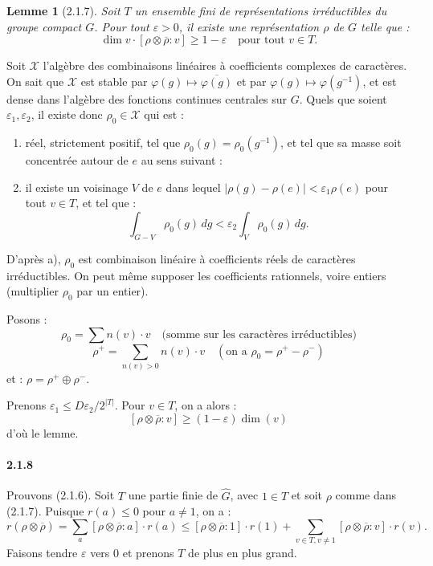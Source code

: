\documentclass[12pt,a4paper]{article}
\theoremstyle{plain}
\newtheorem{lemma}[theorem]{Lemme}
\theoremstyle{definition}
\theoremstyle{remark}
\begin{document}
\begin{lemma}[2.1.7]
Soit $T$ un ensemble fini de repr\'esentations irr\'eductibles du groupe compact $G$. Pour tout $\varepsilon > 0$, il existe une repr\'esentation $\rho$ de $G$ telle que :
\[ \dim v \cdot [\rho \otimes \overline{\rho} : v] \geq 1 - \varepsilon \quad \text{pour tout } v \in T. \]
\end{lemma}

Soit $\mathcal{X}$ l'alg\`ebre des combinaisons lin\'eaires \`a coefficients complexes de caract\`eres. On sait que $\mathcal{X}$ est stable par $\varphi(g) \mapsto \overline{\varphi(g)}$ et par $\varphi(g) \mapsto \varphi(g^{-1})$, et est dense dans l'alg\`ebre des fonctions continues centrales sur $G$. Quels que soient $\varepsilon_1, \varepsilon_2$, il existe donc $\rho_0 \in \mathcal{X}$ qui est :
\begin{enumerate}[label=\alph*)]
\item r\'eel, strictement positif, tel que $\rho_0(g) = \rho_0(g^{-1})$, et tel que sa masse soit concentr\'ee autour de $e$ au sens suivant :
\item il existe un voisinage $V$ de $e$ dans lequel $|\rho(g) - \rho(e)| < \varepsilon_1 \rho(e)$ pour tout $v \in T$, et tel que :
\[ \int_{G-V} \rho_0(g)\, dg < \varepsilon_2 \int_V \rho_0(g)\, dg. \]
\end{enumerate}
D'apr\`es a), $\rho_0$ est combinaison lin\'eaire \`a coefficients r\'eels de caract\`eres irr\'eductibles. On peut m\^eme supposer les coefficients rationnels, voire entiers (multiplier $\rho_0$ par un entier).

Posons :
\[ \rho_0 = \sum n(v) \cdot v \quad \text{(somme sur les caract\`eres irr\'eductibles)} \]
\[ \rho^+ = \sum_{n(v) > 0} n(v) \cdot v \quad (\text{on a } \rho_0 = \rho^+ - \rho^-) \]
et : $\rho = \rho^+ \oplus \rho^-$.

Prenons $\varepsilon_1 \leq D \varepsilon_2 / 2^{|T|}$. Pour $v \in T$, on a alors :
\[ [\rho \otimes \overline{\rho} : v] \geq (1 - \varepsilon) \dim(v) \]
d'o\`u le lemme.

\paragraph{2.1.8}
Prouvons (2.1.6). Soit $T$ une partie finie de $\widehat{G}$, avec $1 \in T$ et soit $\rho$ comme dans (2.1.7). Puisque $r(a) \leq 0$ pour $a \neq 1$, on a :
\[ r(\rho \otimes \overline{\rho}) = \sum_a [\rho \otimes \overline{\rho} : a] \cdot r(a) \leq [\rho \otimes \overline{\rho} : 1] \cdot r(1) + \sum_{v \in T, v \neq 1} [\rho \otimes \overline{\rho} : v] \cdot r(v). \]
Faisons tendre $\varepsilon$ vers $0$ et prenons $T$ de plus en plus grand.
\end{document}
